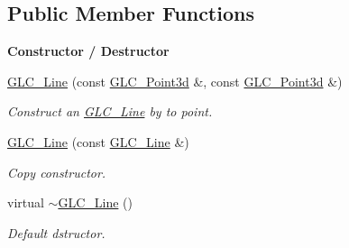 \subsection*{Public Member Functions}
\begin{Indent}{\bf Constructor / Destructor}\par
\begin{DoxyCompactItemize}
\item 
\hyperlink{class_g_l_c___line_ae2b85f0b5ff28dfa2a863fa24c704c93}{G\-L\-C\-\_\-\-Line} (const \hyperlink{glc__vector3d_8h_a4e13a9bbc7ab3d34de7e98b41836772c}{G\-L\-C\-\_\-\-Point3d} \&, const \hyperlink{glc__vector3d_8h_a4e13a9bbc7ab3d34de7e98b41836772c}{G\-L\-C\-\_\-\-Point3d} \&)
\begin{DoxyCompactList}\small\item\em Construct an \hyperlink{class_g_l_c___line}{G\-L\-C\-\_\-\-Line} by to point. \end{DoxyCompactList}\item 
\hyperlink{class_g_l_c___line_a7ecb9594443fdbe823e198ba6dddfe9e}{G\-L\-C\-\_\-\-Line} (const \hyperlink{class_g_l_c___line}{G\-L\-C\-\_\-\-Line} \&)
\begin{DoxyCompactList}\small\item\em Copy constructor. \end{DoxyCompactList}\item 
virtual \hyperlink{class_g_l_c___line_ad2eea5854fc71e8c874529cb5172ddfb}{$\sim$\-G\-L\-C\-\_\-\-Line} ()
\begin{DoxyCompactList}\small\item\em Default dstructor. \end{DoxyCompactList}\end{DoxyCompactItemize}
\end{Indent}
